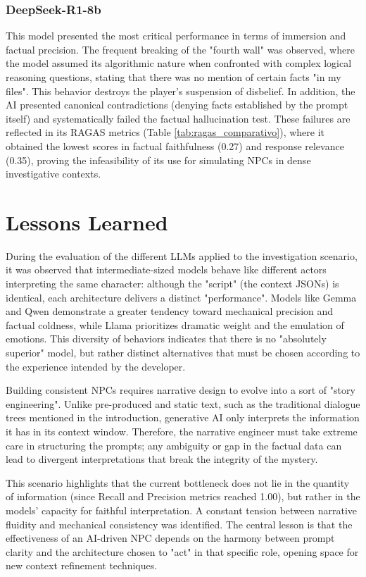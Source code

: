 \documentclass[12pt]{article}
\begin{document}
\subsubsection{DeepSeek-R1-8b}
This model presented the most critical performance in terms of immersion and factual precision. The frequent breaking of the "fourth wall" was observed, where the model assumed its algorithmic nature when confronted with complex logical reasoning questions, stating that there was no mention of certain facts "in my files". This behavior destroys the player's suspension of disbelief. In addition, the AI presented canonical contradictions (denying facts established by the prompt itself) and systematically failed the factual hallucination test. These failures are reflected in its RAGAS metrics (Table \ref{tab:ragas_comparativo}), where it obtained the lowest scores in factual faithfulness (0.27) and response relevance (0.35), proving the infeasibility of its use for simulating NPCs in dense investigative contexts.

\section{Lessons Learned} 

During the evaluation of the different LLMs applied to the investigation scenario, it was observed that intermediate-sized models behave like different actors interpreting the same character: although the "script" (the context JSONs) is identical, each architecture delivers a distinct "performance". Models like Gemma and Qwen demonstrate a greater tendency toward mechanical precision and factual coldness, while Llama prioritizes dramatic weight and the emulation of emotions. This diversity of behaviors indicates that there is no "absolutely superior" model, but rather distinct alternatives that must be chosen according to the experience intended by the developer.

Building consistent NPCs requires narrative design to evolve into a sort of "story engineering". Unlike pre-produced and static text, such as the traditional dialogue trees mentioned in the introduction, generative AI only interprets the information it has in its context window. Therefore, the narrative engineer must take extreme care in structuring the prompts; any ambiguity or gap in the factual data can lead to divergent interpretations that break the integrity of the mystery.

This scenario highlights that the current bottleneck does not lie in the quantity of information (since Recall and Precision metrics reached 1.00), but rather in the models' capacity for faithful interpretation. A constant tension between narrative fluidity and mechanical consistency was identified. The central lesson is that the effectiveness of an AI-driven NPC depends on the harmony between prompt clarity and the architecture chosen to "act" in that specific role, opening space for new context refinement techniques.
\end{document}
